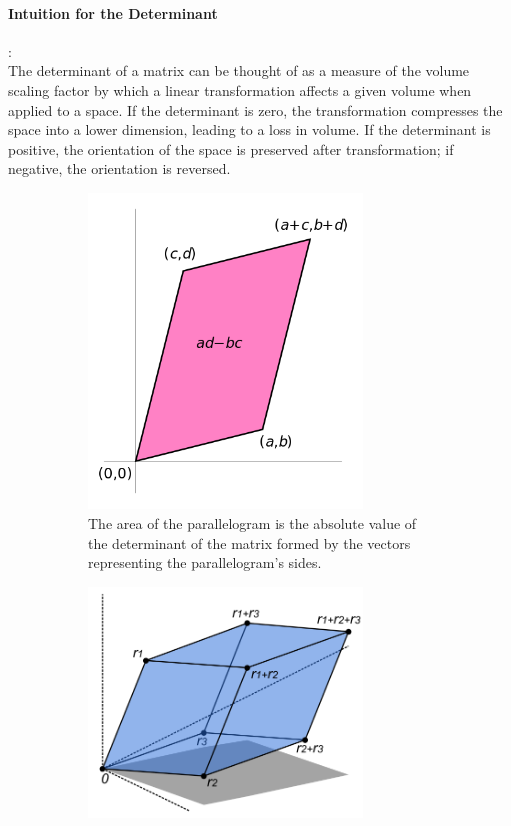 \documentclass[11pt]{book} %
\begin{document}
\paragraph{Intuition for the Determinant} : \\
The determinant of a matrix can be thought of as a measure of the volume scaling factor by which a linear transformation affects a given volume when applied to a space. 
If the determinant is zero, the transformation compresses the space into a lower dimension, leading to a loss in volume. 
If the determinant is positive, the orientation of the space is preserved after transformation; if negative, the orientation is reversed.


\begin{figure}[H]
    \begin{subfigure}{0.4\textwidth}
        \centering
        \includegraphics[width=0.8\textwidth]{Figs/area_parallellogram_as_determinant.png}
        \caption{The area of the parallelogram is the absolute value of the determinant of the matrix formed by the vectors representing the parallelogram's sides.}
    \end{subfigure}
    \hfill
    \begin{subfigure}{0.4\textwidth}
        \centering
        \includegraphics[width=0.8\textwidth]{Figs/determinant_parallelepiped.png}

\end{subfigure}
\end{figure}
\end{document}
